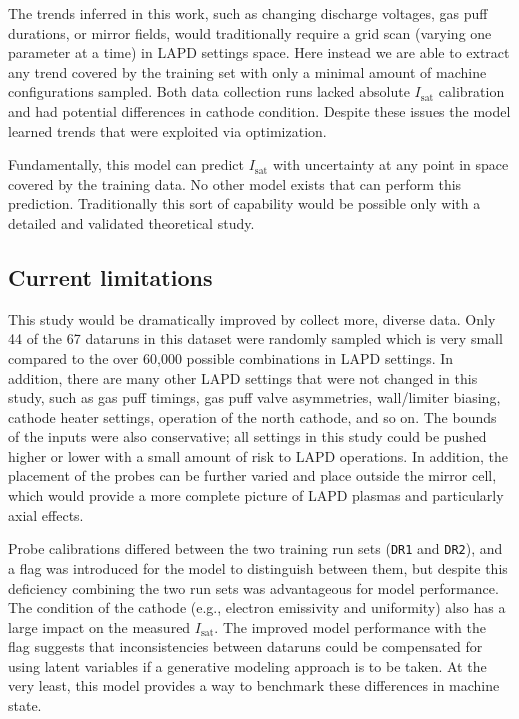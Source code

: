 
The trends inferred in this work, such as changing discharge voltages, gas puff durations, or mirror fields, would traditionally require a grid scan (varying one parameter at a time) in LAPD settings space. Here instead we are able to extract any trend covered by the training set with only a minimal amount of machine configurations sampled. Both data collection runs lacked absolute $I_\text{sat}$ calibration and had potential differences in cathode condition. Despite these issues the model learned trends that were exploited via optimization. 

Fundamentally, this model can predict $I_\text{sat}$ with uncertainty at any point in space covered by the training data. No other model exists that can perform this prediction. Traditionally this sort of capability would be possible only with a detailed and validated theoretical study. 

\subsection{Current limitations}

This study would be dramatically improved by collect more, diverse data. Only 44 of the 67 dataruns in this dataset were randomly sampled which is very small compared to the over 60,000 possible combinations in LAPD settings. In addition, there are many other LAPD settings that were not changed in this study, such as gas puff timings, gas puff valve asymmetries, wall/limiter biasing, cathode heater settings, operation of the north cathode, and so on. The bounds of the inputs were also conservative; all settings in this study could be pushed higher or lower with a small amount of risk to LAPD operations. In addition, the placement of the probes can be further varied and place outside the mirror cell, which would provide a more complete picture of LAPD plasmas and particularly axial effects.

Probe calibrations differed between the two training run sets (\texttt{DR1} and \texttt{DR2}), and a flag was introduced for the model to distinguish between them, but despite this deficiency combining the two run sets was advantageous for model performance. The condition of the cathode (e.g., electron emissivity and uniformity) also has a large impact on the measured $I_\text{sat}$. The improved model performance with the flag suggests that  inconsistencies between dataruns could be compensated for using latent variables if a generative modeling approach is to be taken. At the very least, this model provides a way to benchmark these differences in machine state.


